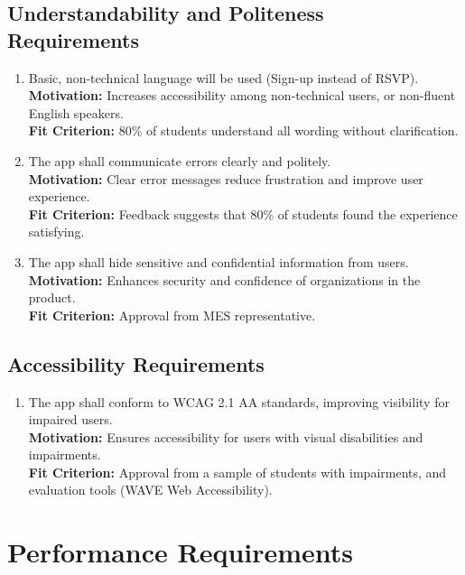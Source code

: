 \documentclass[12pt]{article}
\begin{document}
\subsection{Understandability and Politeness Requirements}
\begin{enumerate}[label=UHR-UPR.\arabic*, wide=0pt, leftmargin=*]
  \item Basic, non-technical language will be used (Sign-up instead of RSVP).\\[2mm]
    {\bf Motivation:} Increases accessibility among non-technical users, or non-fluent English speakers.\\
    {\bf Fit Criterion:} 80\% of students understand all wording without clarification.
  \item The app shall communicate errors clearly and politely.\\[2mm]
    {\bf Motivation:} Clear error messages reduce frustration and improve user experience.\\
    {\bf Fit Criterion:} Feedback suggests that 80\% of students found the experience satisfying.
  \item The app shall hide sensitive and confidential information from users.\\[2mm]
    {\bf Motivation:} Enhances security and confidence of organizations in the product.\\
    {\bf Fit Criterion:} Approval from MES representative.
\end{enumerate}

\subsection{Accessibility Requirements}
\begin{enumerate}[label=UHR-AR.\arabic*, wide=0pt, leftmargin=*]
  \item The app shall conform to WCAG 2.1 AA standards, improving visibility for impaired users.\\[2mm]
    {\bf Motivation:} Ensures accessibility for users with visual disabilities and impairments.\\
    {\bf Fit Criterion:} Approval from a sample of students with impairments, and evaluation tools (WAVE Web Accessibility).
\end{enumerate}

\section{Performance Requirements}
\end{document}

